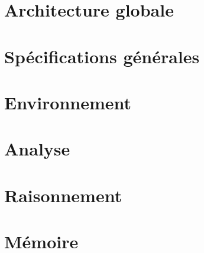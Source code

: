 \section{Architecture globale}



\section{Spécifications générales}



\section{Environnement}



\section{Analyse}



\section{Raisonnement}



\section{Mémoire}

